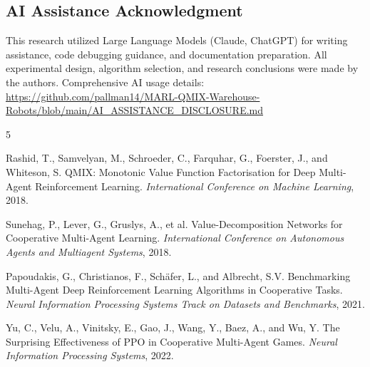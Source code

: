 \documentclass[11pt]{article}
\begin{document}
\subsection*{AI Assistance Acknowledgment} This research utilized Large Language Models (Claude, ChatGPT) for writing assistance, code debugging guidance, and documentation preparation. All experimental design, algorithm selection, and research conclusions were made by the authors. Comprehensive AI usage details: \url{https://github.com/pallman14/MARL-QMIX-Warehouse-Robots/blob/main/AI_ASSISTANCE_DISCLOSURE.md}

\begin{thebibliography}{5}

Rashid, T., Samvelyan, M., Schroeder, C., Farquhar, G., Foerster, J., and Whiteson, S.
\newblock QMIX: Monotonic Value Function Factorisation for Deep Multi-Agent Reinforcement Learning.
\newblock \emph{International Conference on Machine Learning}, 2018.

Sunehag, P., Lever, G., Gruslys, A., et al.
\newblock Value-Decomposition Networks for Cooperative Multi-Agent Learning.
\newblock \emph{International Conference on Autonomous Agents and Multiagent Systems}, 2018.

Papoudakis, G., Christianos, F., Sch{\"a}fer, L., and Albrecht, S.V.
\newblock Benchmarking Multi-Agent Deep Reinforcement Learning Algorithms in Cooperative Tasks.
\newblock \emph{Neural Information Processing Systems Track on Datasets and Benchmarks}, 2021.

Yu, C., Velu, A., Vinitsky, E., Gao, J., Wang, Y., Baez, A., and Wu, Y.
\newblock The Surprising Effectiveness of PPO in Cooperative Multi-Agent Games.
\newblock \emph{Neural Information Processing Systems}, 2022.

\end{thebibliography}
\end{document}
